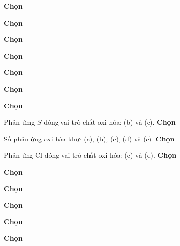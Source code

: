 \begin{loigiaiex}{59}
  \phantom {a}\hfill {\bfseries \sffamily Chọn~} 
\end{loigiaiex}
\begin{loigiaiex}{60}
  \phantom {a}\hfill {\bfseries \sffamily Chọn~} 
\end{loigiaiex}
\begin{loigiaiex}{61}
  \phantom {a}\hfill {\bfseries \sffamily Chọn~} 
\end{loigiaiex}
\begin{loigiaiex}{62}
  \phantom {a}\hfill {\bfseries \sffamily Chọn~} 
\end{loigiaiex}
\begin{loigiaiex}{63}
  \phantom {a}\hfill {\bfseries \sffamily Chọn~} 
\end{loigiaiex}
\begin{loigiaiex}{64}
  \phantom {a}\hfill {\bfseries \sffamily Chọn~} 
\end{loigiaiex}
\begin{loigiaiex}{65}
  \phantom {a}\hfill {\bfseries \sffamily Chọn~} 
\end{loigiaiex}
\begin{loigiaiex}{66}
  Phản ứmg $S$ đóng vai trò chất oxi hóa: (b) và (c).  \phantom {a}\hfill {\bfseries \sffamily Chọn~} 
\end{loigiaiex}
\begin{loigiaiex}{67}
  Số phản ứng oxi hóa-khư: (a), (b), (c), (d) và (e).  \phantom {a}\hfill {\bfseries \sffamily Chọn~} 
\end{loigiaiex}
\begin{loigiaiex}{68}
  Phản ứng $\mathrm {Cl}$ đóng vai trỏ chất oxi hóa: (c) và (d).  \phantom {a}\hfill {\bfseries \sffamily Chọn~} 
\end{loigiaiex}
\begin{loigiaiex}{69}
  \phantom {a}\hfill {\bfseries \sffamily Chọn~} 
\end{loigiaiex}
\begin{loigiaiex}{70}
  \phantom {a}\hfill {\bfseries \sffamily Chọn~} 
\end{loigiaiex}
\begin{loigiaiex}{71}
  \phantom {a}\hfill {\bfseries \sffamily Chọn~} 
\end{loigiaiex}
\begin{loigiaiex}{72}
  \phantom {a}\hfill {\bfseries \sffamily Chọn~} 
\end{loigiaiex}
\begin{loigiaiex}{73}
  \phantom {a}\hfill {\bfseries \sffamily Chọn~} 
\end{loigiaiex}
